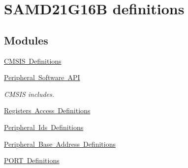 \hypertarget{group___s_a_m_d21_g16_b__definitions}{}\section{S\+A\+M\+D21\+G16B definitions}
\label{group___s_a_m_d21_g16_b__definitions}
\subsection*{Modules}
\begin{DoxyCompactItemize}
\item 
\mbox{\hyperlink{group___s_a_m_d21_g16_b__cmsis}{C\+M\+S\+I\+S Definitions}}
\item 
\mbox{\hyperlink{group___s_a_m_d21_g16_b__api}{Peripheral Software A\+PI}}
\begin{DoxyCompactList}\small\item\em C\+M\+S\+IS includes. \end{DoxyCompactList}\item 
\mbox{\hyperlink{group___s_a_m_d21_g16_b__reg}{Registers Access Definitions}}
\item 
\mbox{\hyperlink{group___s_a_m_d21_g16_b__id}{Peripheral Ids Definitions}}
\item 
\mbox{\hyperlink{group___s_a_m_d21_g16_b__base}{Peripheral Base Address Definitions}}
\item 
\mbox{\hyperlink{group___s_a_m_d21_g16_b__port}{P\+O\+R\+T Definitions}}
\end{DoxyCompactItemize}
